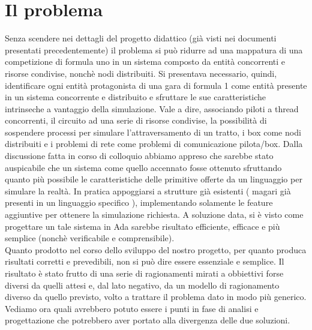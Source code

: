 \section{Il problema}
Senza scendere nei dettagli del progetto didattico (già visti nei documenti presentati precedentemente) il problema si può ridurre ad una mappatura di una competizione di formula uno in un sistema composto da entità concorrenti e risorse condivise, nonchè nodi distribuiti.
Si presentava necessario, quindi, identificare ogni entità protagonista di una gara di formula 1 come entità presente in un sistema concorrente e distribuito e sfruttare le sue caratteristiche intrinseche a vantaggio della simulazione.
Vale a dire, associando piloti a thread concorrenti, il circuito ad una serie di risorse condivise, la possibilità di sospendere processi per simulare l’attraversamento di un tratto, i box come nodi distribuiti e i problemi di rete come problemi di comunicazione pilota/box. 
Dalla discussione fatta in corso di colloquio abbiamo appreso che sarebbe stato auspicabile che un sistema come quello accennato fosse ottenuto sfruttando quanto più possibile le caratteristiche delle primitive offerte da un linguaggio per simulare la realtà. In pratica appoggiarsi a strutture già esistenti ( magari già presenti in un linguaggio specifico ), implementando solamente le feature aggiuntive per ottenere la simulazione richiesta.
A soluzione data, si è visto come progettare un tale sistema in Ada sarebbe risultato efficiente, efficace e più semplice (nonchè verificabile e comprensibile).\\
Quanto prodotto nel corso dello sviluppo del nostro progetto, per quanto produca risultati corretti e prevedibili, non si può dire essere essenziale e semplice. Il risultato è stato frutto di una serie di ragionamenti mirati a obbiettivi forse diversi da quelli attesi e, dal lato negativo, da un modello di ragionamento diverso da quello previsto, volto a trattare il problema dato in modo più generico. Vediamo ora quali avrebbero potuto essere i punti in fase di analisi e progettazione che potrebbero aver portato alla divergenza delle due soluzioni.